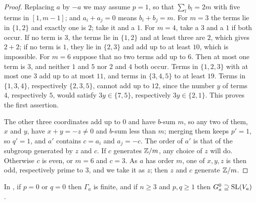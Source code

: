 \begin{proof}
Replacing $a$ by $-a$ we may assume $p=1$, so that $\sum_{l}b_{l}=2m$ with
five terms in $[1,m-1]$; and $a_{i}+a_{j}=0$ means $b_{i}+b_{j}=m$. For $m=3$
the terms lie in $\{1,2\}$ and exactly one is $2$; take it and a $1$. For
$m=4$, take a $3$ and a $1$ if both occur. If no term is $3$, the terms lie in
$\{1,2\}$ and at least three are $2$, which gives $2+2$; if no term is $1$,
they lie in $\{2,3\}$ and add up to at least $10$, which is impossible. For
$m=6$ suppose that no two terms add up to $6$. Then at most one term is $3$,
and neither $1$ and $5$ nor $2$ and $4$ both occur. Terms in $\{1,2,3\}$ with
at most one $3$ add up to at most $11$, and terms in $\{3,4,5\}$ to at least
$19$. Terms in $\{1,3,4\}$, respectively $\{2,3,5\}$, cannot add up to $12$,
since the number $y$ of terms $4$, respectively $5$, would satisfy
$3y\in\{7,5\}$, respectively $3y\in\{2,1\}$. This proves the first assertion.

The other three coordinates add up to $0$ and have $b$-sum $m$, so any two of
them, $x$ and $y$, have $x+y=-z\ne0$ and $b$-sum less than $m$; merging them
keeps $p'=1$, so $q'=1$, and $a'$ contains $c=a_{i}$ and $a_{j}=-c$. The order
of $a'$ is that of the subgroup generated by $z$ and $c$. If $c$ generates
$\mathbb{Z}/m$, any choice of $z$ will do. Otherwise $c$ is even, or $m=6$ and $c=3$.
As $a$ has order $m$, one of $x,y,z$ is then odd, respectively prime to $3$,
and we take it as $z$; then $z$ and $c$ generate $\mathbb{Z}/m$.
\end{proof}

\begin{proposition}\label{prop:cyclicmonodromy}
In , if $p=0$ or $q=0$ then $\Gamma_{a}$ is finite, and if
$n\ge3$ and $p,q\ge1$ then $G_{a}^{0}\supseteq\operatorname{SL}(V_{a})$.
\end{proposition}

